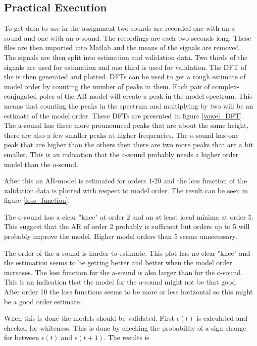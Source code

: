 \documentclass[12pt]{article}
\begin{document}
\subsection{Practical Execution}
To get data to use in the assignment two sounds are recorded one with an a-sound and one with an o-sound.
The recordings are each two seconds long.
These files are then imported into Matlab and the means of the signals are removed.
The signals are then split into estimation and validation data.
Two thirds of the signals are used for estimation and one third is used for validation.
The DFT of the is then generated and plotted.
DFTs can be used to get a rough estimate of model order by counting the number of peaks in them.
Each pair of complex-conjugated poles of the AR model will create a peak in the model spectrum.
This means that counting the peaks in the spectrum and multiplying by two will be an estimate of the model order.
These DFTs are presented in figure \ref{vowel_DFT}.
The a-sound has three more prounounced peaks that are about the same height, there are also a few smaller peaks at higher frequencies.
The o-sound has one peak that are higher than the others then there are two more peaks that are a bit smaller.
This is an indication that the a-sound probably needs a higher order model than the o-sound.

After this an AR-model is estimated for orders 1-20 and the loss function of the validation data is plotted with respect to model order.
The result can be seen in figure \ref{loss_function}. 

The o-sound has a clear "knee" at order 2 and an at least local minima at order 5.
This suggest that the AR of order 2 probably is sufficient but orders up to 5 will probably improve the model.
Higher model orders than 5 seems unnecessary.

The order of the a-sound is harder to estimate.
This plot has no clear "knee" and the estimation seems to be getting better and better when the model order increases.
The loss function for the a-sound is also larger than for the o-sound.
This is an indication that the model for the a-sound might not be that good.
After order 10 the loss functions seems to be more or less horizontal so this might be a good order estimate.

When this is done the models should be validated.
First $\epsilon(t)$ is calculated and checked for whiteness.
This is done by checking the probability of a sign change for between $\epsilon(t)$ and $\epsilon(t+1)$.
The results is
\end{document}
